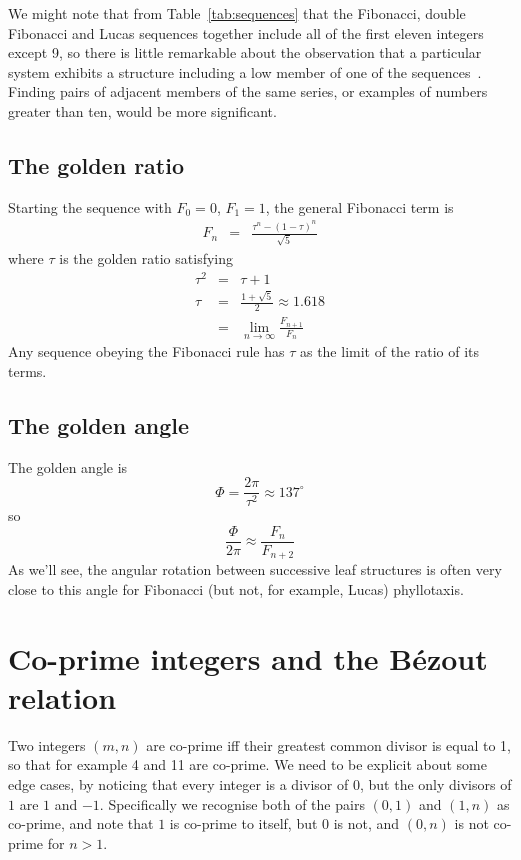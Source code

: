 We might note that from Table~\ref{tab:sequences} that the Fibonacci, double Fibonacci and Lucas sequences together include all  of the first eleven integers except 9, so there is little remarkable about the observation that a particular system exhibits a structure including a low member of one of the sequences~\cite{cookeFibonacciNumbersReveal2006}. Finding pairs of adjacent members of the same series, or examples of numbers greater than ten, would be more significant.

\subsection{The golden ratio}
Starting the sequence with $F_0=0$, $F_1=1$, the general Fibonacci term is 
\begin{eqnarray}
F_n &=& \frac{\tau^n - (1-\tau)^n}{\sqrt{5}}
\end{eqnarray}
where $\tau$ is the golden ratio 
satisfying
\begin{eqnarray}
\tau^2 &=& \tau+1
\\
\tau &=& \frac{1+\sqrt{5}}{2} \approx 1.618
\\
&=& \lim_{n\rightarrow\infty} \frac{F_{n+1}}{F_n} 
\end{eqnarray}
Any sequence obeying the Fibonacci rule has $\tau$  as the limit of the ratio of its terms.

\subsection{The golden angle}
The golden angle is
\[
\Phi = \frac{2\pi}{\tau^2}  \approx 137^\circ
\]
so
\[
\frac{\Phi}{2 \pi} \approx \frac{F_{n}}{F_{n+2}}
\]
As we'll see, the angular rotation between successive leaf structures is often very close to this angle for Fibonacci (but not, for example, Lucas) phyllotaxis.




\section{Co-prime integers and the B\'ezout relation}

\label{sec:coprime}
Two integers $(m,n)$ are co-prime iff their greatest common divisor is equal to 1, so that for example 4 and 11 are co-prime. We need to be explicit about some edge cases, by noticing that every integer is a divisor of $0$, but the only divisors of $1$ are $1$ and $-1$. Specifically we recognise both of the pairs $(0,1)$ and $(1,n)$ as co-prime, and note that $1$ is co-prime to itself, but $0$ is not, and $(0,n)$ is not co-prime for $n>1$.%

